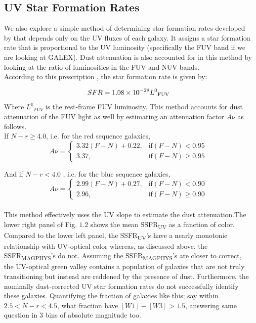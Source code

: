 \subsection{UV Star Formation Rates}
We also explore a simple method of determining star formation rates developed by \citet{salim_uv_2007-1} that depends only on the UV fluxes of each galaxy. It assigns a star formation rate that is proportional to the UV luminosity (specifically the FUV band if we are looking at GALEX). Dust attenuation is also accounted for in this method by looking at the ratio of luminosities in the FUV and NUV bands.\\

According to this prescription \citep{salim_uv_2007-1}, the star formation rate is given by:

$$ SFR = 1.08 \times 10^{-28}{L^{0}}_{\rm FUV} $$
Where ${L^{0}}_{FUV}$ is the rest-frame FUV luminosity. This method accounts for dust attenuation of the FUV light as well by estimating an attenuation factor $A\nu$ as follows.\\

If $N-r \geq 4.0$, i.e. for the red sequence galaxies,\\

$$ A\nu = \begin{cases} 3.32 (F-N) + 0.22, & \text{if} (F-N) < 0.95\\3.37, & \text{if} (F-N) \geq 0.95 \end{cases}$$

And if $N-r < 4.0$ , i.e. for the blue sequence galaxies,\\

$$A\nu = \begin{cases} 2.99(F-N) + 0.27, & \text{if}(F-N) < 0.90\\2.96, & \text{if} (F-N) \geq 0.90 \end{cases}$$\\

This method effectively uses the UV slope to estimate the dust attenuation.The lower right panel of Fig. $1.2$ shows the mean SSFR\textsubscript{UV} as a function of color. Compared to the lower left panel, the SSFR\textsubscript{UV}'s have a nearly monotonic relationship with UV-optical color whereas, as discussed above, the SSFR\textsubscript{MAGPHYS}'s do not. Assuming the SSFR\textsubscript{MAGPHYS}'s are closer to correct, the UV-optical green valley contains a population of galaxies that are not truly transitioning but instead are reddened by the presence of dust. Furthermore, the nominally dust-corrected UV star formation rates do not successfully identify these galaxies. Quantifying the fraction of galaxies like this; say within $2.5 < N-r < 4.5$, what fraction have $[W1]-[W3] > 1.5$, answering same question in 3 bins of absolute magnitude too.\\


